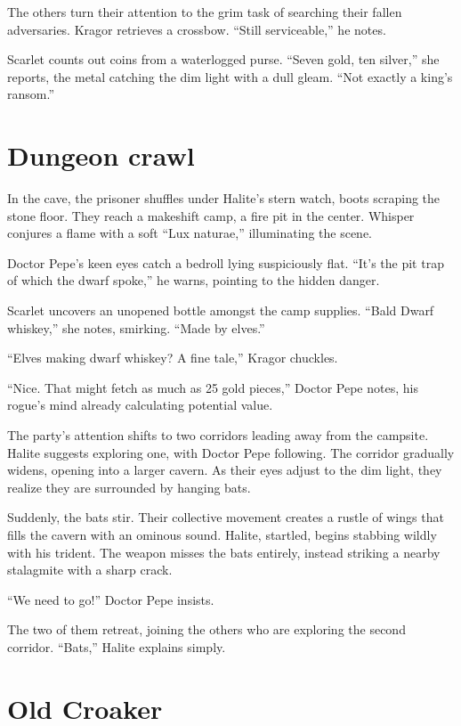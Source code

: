 \documentclass[
  letterpaper,12pt,twoside,twocolumn,openany,
  nodeprecatedcode,bg=full]{dndbook}
\begin{document}
The others turn their attention to the grim task of searching their
fallen adversaries. Kragor retrieves a crossbow. ``Still serviceable,''
he notes.

Scarlet counts out coins from a waterlogged purse. ``Seven gold, ten
silver,'' she reports, the metal catching the dim light with a dull
gleam. ``Not exactly a king's ransom.''

\section{Dungeon crawl}\label{dungeon-crawl}

In the cave, the prisoner shuffles under Halite's stern watch, boots
scraping the stone floor. They reach a makeshift camp, a fire pit in the
center. Whisper conjures a flame with a soft ``Lux naturae,''
illuminating the scene.

Doctor Pepe's keen eyes catch a bedroll lying suspiciously flat. ``It's
the pit trap of which the dwarf spoke,'' he warns, pointing to the
hidden danger.

Scarlet uncovers an unopened bottle amongst the camp supplies. ``Bald
Dwarf whiskey,'' she notes, smirking. ``Made by elves.''

``Elves making dwarf whiskey? A fine tale,'' Kragor chuckles.

``Nice. That might fetch as much as 25 gold pieces,'' Doctor Pepe notes,
his rogue's mind already calculating potential value.

The party's attention shifts to two corridors leading away from the
campsite. Halite suggests exploring one, with Doctor Pepe following. The
corridor gradually widens, opening into a larger cavern. As their eyes
adjust to the dim light, they realize they are surrounded by hanging
bats.

Suddenly, the bats stir. Their collective movement creates a rustle of
wings that fills the cavern with an ominous sound. Halite, startled,
begins stabbing wildly with his trident. The weapon misses the bats
entirely, instead striking a nearby stalagmite with a sharp crack.

``We need to go!'' Doctor Pepe insists.

The two of them retreat, joining the others who are exploring the second
corridor. ``Bats,'' Halite explains simply.

\section{Old Croaker}\label{old-croaker}
\end{document}

